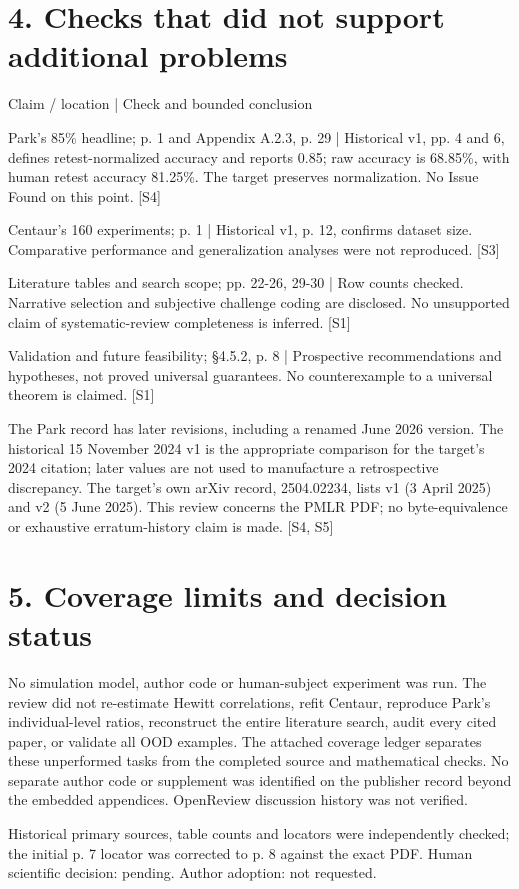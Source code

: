 \documentclass[10pt]{article}
\begin{document}
\section*{4. Checks that did not support additional problems}
Claim / location | Check and bounded conclusion\par
Park’s 85\% headline; p. 1 and Appendix A.2.3, p. 29 | Historical v1, pp. 4 and 6, defines retest-normalized accuracy and reports 0.85; raw accuracy is 68.85\%, with human retest accuracy 81.25\%. The target preserves normalization. No Issue Found on this point. [S4]\par
Centaur’s 160 experiments; p. 1 | Historical v1, p. 12, confirms dataset size. Comparative performance and generalization analyses were not reproduced. [S3]\par
Literature tables and search scope; pp. 22-26, 29-30 | Row counts checked. Narrative selection and subjective challenge coding are disclosed. No unsupported claim of systematic-review completeness is inferred. [S1]\par
Validation and future feasibility; §4.5.2, p. 8 | Prospective recommendations and hypotheses, not proved universal guarantees. No counterexample to a universal theorem is claimed. [S1]\par
The Park record has later revisions, including a renamed June 2026 version. The historical 15 November 2024 v1 is the appropriate comparison for the target’s 2024 citation; later values are not used to manufacture a retrospective discrepancy. The target’s own arXiv record, 2504.02234, lists v1 (3 April 2025) and v2 (5 June 2025). This review concerns the PMLR PDF; no byte-equivalence or exhaustive erratum-history claim is made. [S4, S5]\par
\section*{5. Coverage limits and decision status}
No simulation model, author code or human-subject experiment was run. The review did not re-estimate Hewitt correlations, refit Centaur, reproduce Park’s individual-level ratios, reconstruct the entire literature search, audit every cited paper, or validate all OOD examples. The attached coverage ledger separates these unperformed tasks from the completed source and mathematical checks. No separate author code or supplement was identified on the publisher record beyond the embedded appendices. OpenReview discussion history was not verified.\par
Historical primary sources, table counts and locators were independently checked; the initial p. 7 locator was corrected to p. 8 against the exact PDF. Human scientific decision: pending. Author adoption: not requested.\par
\end{document}
